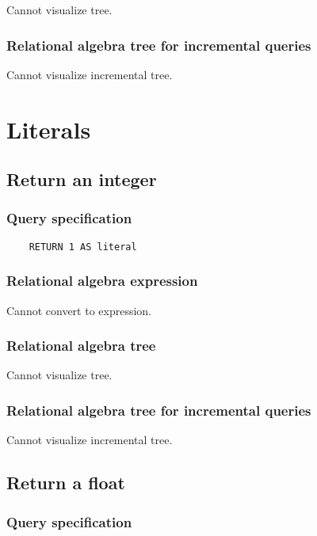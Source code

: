 	Cannot visualize tree.

	\subsubsection*{Relational algebra tree for incremental queries}

	Cannot visualize incremental tree.

	\section{Literals}

	\subsection{Return an integer}

	\subsubsection*{Query specification}

	\begin{lstlisting}
	RETURN 1 AS literal
	\end{lstlisting}


	\subsubsection*{Relational algebra expression}

	Cannot convert to expression.

	\subsubsection*{Relational algebra tree}

	Cannot visualize tree.

	\subsubsection*{Relational algebra tree for incremental queries}

	Cannot visualize incremental tree.
	\subsection{Return a float}

	\subsubsection*{Query specification}

